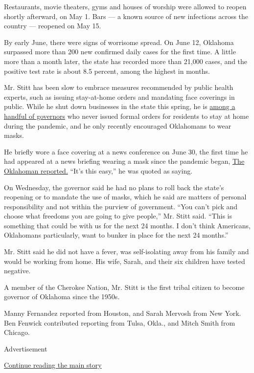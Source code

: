 Restaurants, movie theaters, gyms and houses of worship were allowed to
reopen shortly afterward, on May 1. Bars --- a known source of new
infections across the country --- reopened on May 15.

By early June, there were signs of worrisome spread. On June 12,
Oklahoma surpassed more than 200 new confirmed daily cases for the first
time. A little more than a month later, the state has recorded more than
21,000 cases, and the positive test rate is about 8.5 percent, among the
highest in months.

Mr. Stitt has been slow to embrace measures recommended by public health
experts, such as issuing stay-at-home orders and mandating face
coverings in public. While he shut down businesses in the state this
spring, he is
\href{https://www.nytimes.com/2020/04/03/us/coronavirus-states-without-stay-home.html}{among
a handful of governors} who never issued formal orders for residents to
stay at home during the pandemic, and he only recently encouraged
Oklahomans to wear masks.

He briefly wore a face covering at a news conference on June 30, the
first time he had appeared at a news briefing wearing a mask since the
pandemic began,
\href{https://oklahoman.com/article/5665748/gov-kevin-stitt-urges-oklahomans-to-wear-masks-in-public}{The
Oklahoman reported.} ``It's this easy,'' he was quoted as saying.

On Wednesday, the governor said he had no plans to roll back the state's
reopening or to mandate the use of masks, which he said are matters of
personal responsibility and not within the purview of government. ``You
can't pick and choose what freedoms you are going to give people,'' Mr.
Stitt said. ``This is something that could be with us for the next 24
months. I don't think Americans, Oklahomans particularly, want to bunker
in place for the next 24 months.''

Mr. Stitt said he did not have a fever, was self-isolating away from his
family and would be working from home. His wife, Sarah, and their six
children have tested negative.

A member of the Cherokee Nation, Mr. Stitt is the first tribal citizen
to become governor of Oklahoma since the 1950s.

Manny Fernandez reported from Houston, and Sarah Mervosh from New York.
Ben Fenwick contributed reporting from Tulsa, Okla., and Mitch Smith
from Chicago.

Advertisement

\protect\hyperlink{after-bottom}{Continue reading the main story}

